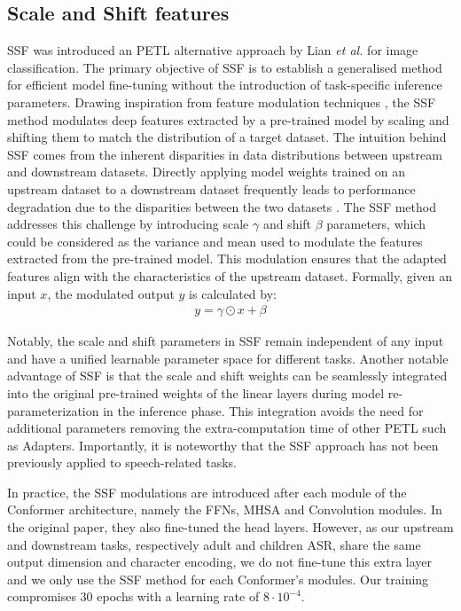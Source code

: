 \subsection{Scale and Shift features}
\ac{SSF} was introduced an \ac{PETL} alternative approach by Lian \textit{et al.} \cite{lian2022scaling} for image classification. The primary objective of \ac{SSF} is to establish a generalised method for efficient model fine-tuning without the introduction of task-specific inference parameters. Drawing inspiration from feature modulation techniques \cite{wu2018group,huang2017arbitrary}, the \ac{SSF} method modulates deep features extracted by a pre-trained model by scaling and shifting them to match the distribution of a target dataset. 
The intuition behind \ac{SSF} comes from the inherent disparities in data distributions between upstream and downstream datasets. Directly applying model weights trained on an upstream dataset to a downstream dataset frequently leads to performance degradation due to the disparities between the two datasets \cite{sun2016return}. The \ac{SSF} method addresses this challenge by introducing scale $\gamma$ and shift $\beta$ parameters, which could be considered as the variance and mean used to modulate the features extracted from the pre-trained model. This modulation ensures that the adapted features align with the characteristics of the upstream dataset. Formally, given an input $x$, the modulated output $y$ is calculated by:
\begin{align}
    y = \gamma \odot x + \beta
\end{align}

Notably, the scale and shift parameters in \ac{SSF} remain independent of any input and have a unified learnable parameter space for different tasks. Another notable advantage of \ac{SSF} is that the scale and shift weights can be seamlessly integrated into the original pre-trained weights of the linear layers during model re-parameterization in the inference phase. This integration avoids the need for additional parameters removing the extra-computation time of other \ac{PETL} such as Adapters. Importantly, it is noteworthy that the \ac{SSF} approach has not been previously applied to speech-related tasks.

In practice, the \ac{SSF} modulations are introduced after each module of the Conformer architecture, namely the \acp{FFN}, \ac{MHSA} and Convolution modules. In the original paper, they also fine-tuned the head layers. However, as our upstream and downstream tasks, respectively adult and children \ac{ASR}, share the same output dimension and character encoding, we do not fine-tune this extra layer and we only use the \ac{SSF} method for each Conformer's modules. Our training compromises 30 epochs with a learning rate of $8\cdot10^{-4}$.

